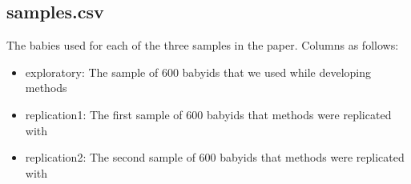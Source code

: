 \documentclass[11pt]{article}
\begin{document}
\subsection*{samples.csv}

The babies used for each of the three samples in the paper. Columns as follows:

\begin{itemize}
\item exploratory: The sample of 600 babyids that we used while developing methods
\item replication1: The first sample of 600 babyids that methods were replicated with
\item replication2: The second sample of 600 babyids that methods were replicated with
\end{itemize}
% 
\end{document}
